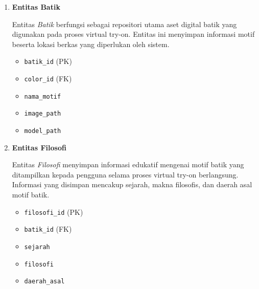 \begin{enumerate}
        Entitas \textit{Personal Color} menyimpan data kategori musim warna yang digunakan sebagai acuan rekomendasi batik. Kategori warna yang digunakan terdiri atas Spring, Summer, Autumn, dan Winter.
    
        \begin{itemize}
            \item \texttt{color\_id} (PK)
            \item \texttt{season\_name}
            \item \texttt{description}
        \end{itemize}
    
        \item \textbf{Entitas Batik}
    
        Entitas \textit{Batik} berfungsi sebagai repositori utama aset digital batik yang digunakan pada proses virtual try-on. Entitas ini menyimpan informasi motif beserta lokasi berkas yang diperlukan oleh sistem.
    
        \begin{itemize}
            \item \texttt{batik\_id} (PK)
            \item \texttt{color\_id} (FK)
            \item \texttt{nama\_motif}
            \item \texttt{image\_path}
            \item \texttt{model\_path}
        \end{itemize}
    
        \item \textbf{Entitas Filosofi}
    
        Entitas \textit{Filosofi} menyimpan informasi edukatif mengenai motif batik yang ditampilkan kepada pengguna selama proses virtual try-on berlangsung. Informasi yang disimpan mencakup sejarah, makna filosofis, dan daerah asal motif batik.
    
        \begin{itemize}
            \item \texttt{filosofi\_id} (PK)
            \item \texttt{batik\_id} (FK)
            \item \texttt{sejarah}
            \item \texttt{filosofi}
            \item \texttt{daerah\_asal}
        \end{itemize}
    
    \end{enumerate}
    
